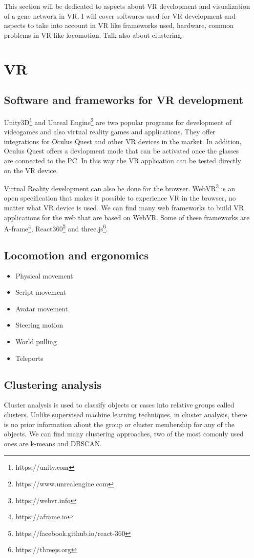 This section will be dedicated to aspects about VR development and visualization of a gene network in VR. I will cover softwares used for VR development and aspects to take into account in VR like frameworks used, hardware, common problems in VR like locomotion. Talk also about clustering.

\section{VR}

\subsection{Software and frameworks for VR development}
Unity3D\footnote{https://unity.com} and Unreal Engine\footnote{https://www.unrealengine.com} are two popular programs for development of videogames and also virtual reality games and applications. They offer integrations for Oculus Quest and other VR devices in the market. In addition, Oculus Quest offers a devlopment mode that can be activated once the glasses are connected to the PC. In this way the VR application can be tested directly on the VR device.

Virtual Reality development can also be done for the browser. WebVR\footnote{https://webvr.info} is an open specification that makes it possible to experience VR in the browser, no matter what VR device is used. We can find many web frameworks to build VR applications for the web that are based on WebVR. Some of these frameworks are A-frame\footnote{https://aframe.io}, React360\footnote{https://facebook.github.io/react-360} and three.js\footnote{https://threejs.org}.

\subsection{Locomotion and ergonomics}
\begin{itemize}
  \item Physical movement
  \item Script movement
  \item Avatar movement
  \item Steering motion
  \item World pulling
  \item Teleports
\end{itemize}

\subsection{Clustering analysis}
Cluster analysis is used to classify objects or cases into relative groups called clusters. Unlike supervised machine learning techniques, in cluster analysis, there is no prior information about the group or cluster membership for any of the objects. We can find many clustering approaches, two of the most comonly used ones are k-means and DBSCAN.

